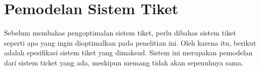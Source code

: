 \section{Pemodelan Sistem Tiket}
\label{apx:analisis-kebutuhan}

Sebelum membahas pengoptimalan sistem tiket, perlu dibahas sistem tiket seperti apa yang ingin dioptimalkan pada penelitian ini. Oleh karena itu, berikut adalah spesifikasi sistem tiket yang dimaksud. Sistem ini merupakan pemodelan dari sistem ticket yang ada, meskipun memang tidak akan sepenuhnya sama.





